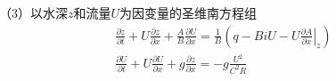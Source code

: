                                                             （3）以水深$z$和流量$U$为因变量的圣维南方程组
                                                            \begin{equation}
                                                              \begin{gathered}
                                                                \frac{\partial z}{\partial t}
                                                                +
                                                                U\frac{\partial z}{\partial x}
                                                                +
                                                                \frac{A}{B}\frac{\partial U}{\partial x}
                                                                =
                                                                \frac{1}{B}
                                                                \left(
                                                                  q - BiU - U\left.\frac{\partial A}{\partial x}\right|_{z}
                                                                  \right)
                                                                  \\
                                                                  \frac{\partial U}{\partial t}
                                                                  +
                                                                  U\frac{\partial U}{\partial x}
                                                                  +
                                                                  g\frac{\partial z}{\partial x}
                                                                  =
                                                                  -g\frac{U^{2}}{C^{2}R}
                                                                \end{gathered}
                                                                \label{EqCGe_SV_zU}
                                                              \end{equation}


